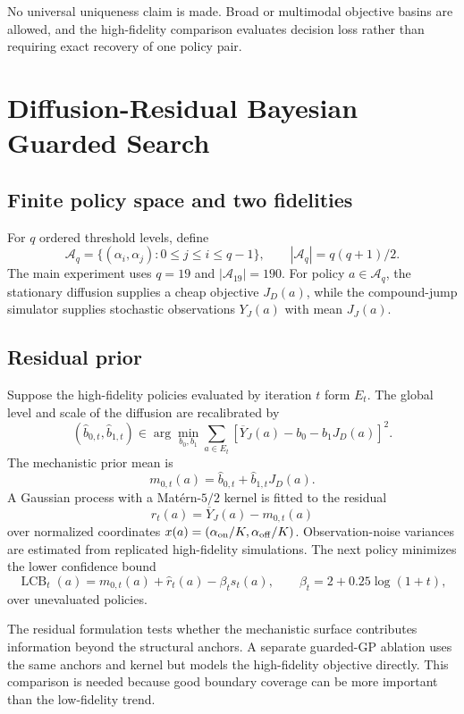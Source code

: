 \documentclass[preprint,12pt]{elsarticle}
\newcommand{\Aset}{\mathcal{A}}
\begin{document}
No universal uniqueness claim is made. Broad or multimodal objective basins are
allowed, and the high-fidelity comparison evaluates decision loss rather than
requiring exact recovery of one policy pair.

\section{Diffusion-Residual Bayesian Guarded Search}
\label{sec:method}

\subsection{Finite policy space and two fidelities}

For $q$ ordered threshold levels, define
\[
\Aset_q=\{(\alpha_i,\alpha_j):0\le j\le i\le q-1\},
\qquad |\Aset_q|=q(q+1)/2.
\]
The main experiment uses $q=19$ and $|\Aset_{19}|=190$. For policy $a\in\Aset_q$, the stationary diffusion supplies a cheap objective $J_D(a)$, while the compound-jump simulator supplies stochastic observations $Y_J(a)$ with mean $J_J(a)$.

\subsection{Residual prior}

Suppose the high-fidelity policies evaluated by iteration $t$ form $E_t$. The global level and scale of the diffusion are recalibrated by
\[
(\widehat b_{0,t},\widehat b_{1,t})
\in\arg\min_{b_0,b_1}
\sum_{a\in E_t}
\left[\overline Y_J(a)-b_0-b_1J_D(a)\right]^2.
\]
The mechanistic prior mean is
\[
m_{0,t}(a)=\widehat b_{0,t}+\widehat b_{1,t}J_D(a).
\]
A Gaussian process with a Mat\'ern-$5/2$ kernel is fitted to the residual
\[
r_t(a)=\overline Y_J(a)-m_{0,t}(a)
\]
over normalized coordinates $x(a)=(\alpha_{\rm on}/K,\alpha_{\rm off}/K)$. Observation-noise variances are estimated from replicated high-fidelity simulations. The next policy minimizes the lower confidence bound
\[
\operatorname{LCB}_t(a)=m_{0,t}(a)+\widehat r_t(a)-\beta_t s_t(a),
\qquad
\beta_t=2+0.25\log(1+t),
\]
over unevaluated policies.

The residual formulation tests whether the mechanistic surface contributes information beyond the structural anchors. A separate guarded-GP ablation uses the same anchors and kernel but models the high-fidelity objective directly. This comparison is needed because good boundary coverage can be more important than the low-fidelity trend.
\end{document}
